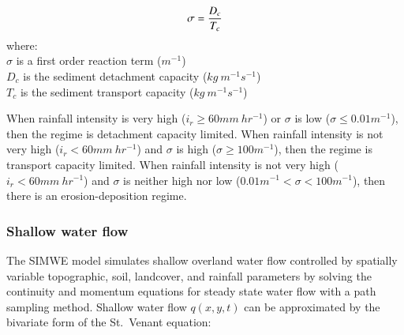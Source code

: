 \documentclass[final,3p,times,twocolumn]{elsarticle}
\begin{document}
\begin{equation}
\label{eq:regime}
\sigma = {D_c \over T_c}
\end{equation}
%
{\small
\noindent
where: \\
\noindent
\hspace*{0.5em} $\sigma$  is a first order reaction term ($m^{-1}$)\\
\hspace*{0.5em} $D_c$ is the sediment detachment capacity ($kg~m^{-1}s^{-1}$)\\
\hspace*{0.5em} $T_c$ is the sediment transport capacity ($kg~m^{-1}s^{-1}$)\\
}

%

When rainfall intensity is very high ($i_r \geq 60 mm~hr^{-1}$)
or $\sigma$ is low ($\sigma \leq 0.01 m^{-1}$),
then the regime is detachment capacity limited. 
%
When rainfall intensity is not very high ($i_r < 60 mm~hr^{-1} $)
and $\sigma$ is high ($\sigma \geq 100 m^{-1}$),
then the regime is transport capacity limited. 
%
When rainfall intensity is not very high ($i_r<60 mm~hr^{-1}$)
and $\sigma$ is neither high nor low ($ 0.01 m^{-1}< \sigma < 100 m^{-1}$),
then there is an erosion-deposition regime. \\

\subsubsection{Shallow water flow}
The SIMWE model
simulates shallow overland water flow 
controlled by spatially variable topographic, soil, landcover, and rainfall parameters
by solving the continuity and momentum equations 
for steady state water flow with a path sampling method. 
Shallow water flow $q(x,y,t)$ can be approximated by
the bivariate form of the St.~Venant equation:
\end{document}
